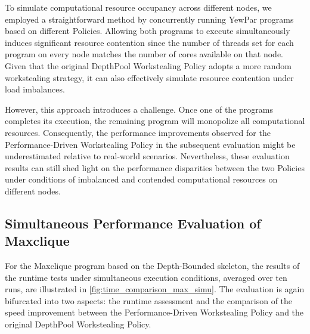 \documentclass{mproj}
\begin{document}
To simulate computational resource occupancy across different nodes,
we employed a straightforward method by concurrently running YewPar programs based on different Policies.
Allowing both programs to execute simultaneously induces significant resource contention since the number of threads set for each program on every node matches the number of cores available on that node.
Given that the original DepthPool Workstealing Policy adopts a more random workstealing strategy, it can also effectively simulate resource contention under load imbalances.

However, this approach introduces a challenge.
Once one of the programs completes its execution, the remaining program will monopolize all computational resources.
Consequently, the performance improvements observed for the Performance-Driven Workstealing Policy in the subsequent evaluation might be underestimated relative to real-world scenarios.
Nevertheless, these evaluation results can still shed light on the performance disparities between the two Policies under conditions of imbalanced and contended computational resources on different nodes.

\subsection{Simultaneous Performance Evaluation of Maxclique}

For the Maxclique program based on the Depth-Bounded skeleton, the results of the runtime tests under simultaneous execution conditions, averaged over ten runs, are illustrated in \ref{fig:time_comparison_max_simu}.
The evaluation is again bifurcated into two aspects: the runtime assessment and the comparison of the speed improvement between the Performance-Driven Workstealing Policy and the original DepthPool Workstealing Policy.
\end{document}

